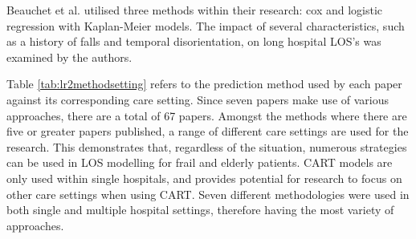 \documentclass[../thesis.tex]{subfiles}
\begin{document}
Beauchet et al. \cite{Beauchet2018} utilised three methods within their research: cox and logistic regression with Kaplan-Meier models. The impact of several characteristics, such as a history of falls and temporal disorientation, on long hospital LOS's was examined by the authors.

Table \ref{tab:lr2methodsetting} refers to the prediction method used by each paper against its corresponding care setting. Since seven papers make use of various approaches, there are a total of 67 papers. Amongst the methods where there are five or greater papers published, a range of different care settings are used for the research. This demonstrates that, regardless of the situation, numerous strategies can be used in LOS modelling for frail and elderly patients. CART models are only used within single hospitals, and provides potential for research to focus on other care settings when using CART. Seven different methodologies were used in both single and multiple hospital settings, therefore having the most variety of approaches.
\end{document}
